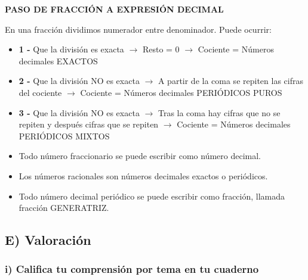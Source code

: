 \documentclass[12pt,a4paper]{article}
\begin{document}
\begin{tcolorbox}[colback=fondoverde,colframe=verdeclaro,breakable]
\textbf{PASO DE FRACCIÓN A EXPRESIÓN DECIMAL}

En una fracción dividimos numerador entre denominador. Puede ocurrir:

\begin{itemize}
\item \textbf{1 -} Que la división es exacta $\rightarrow$ Resto = 0 $\rightarrow$ Cociente = Números decimales EXACTOS

\item \textbf{2 -} Que la división NO es exacta $\rightarrow$ A partir de la coma se repiten las cifras del cociente $\rightarrow$ Cociente = Números decimales PERIÓDICOS PUROS

\item \textbf{3 -} Que la división NO es exacta $\rightarrow$ Tras la coma hay cifras que no se repiten y después cifras que se repiten $\rightarrow$ Cociente = Números decimales PERIÓDICOS MIXTOS
\end{itemize}

\vspace{0.5cm}

\begin{itemize}
\item Todo número fraccionario se puede escribir como número decimal.
\item Los números racionales son números decimales exactos o periódicos.
\item Todo número decimal periódico se puede escribir como fracción, llamada fracción GENERATRIZ.
\end{itemize}
\end{tcolorbox}


\subsection*{E) Valoración}

\subsubsection*{i) Califica tu comprensión por tema en tu cuaderno}
\end{document}
